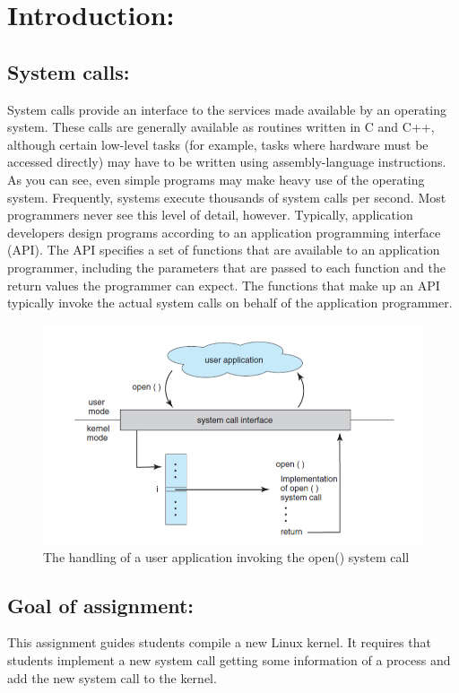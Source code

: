 \documentclass[a4paper]{article}
\begin{document}

\newpage
\tableofcontents
\newpage
\section{Introduction:}
\subsection{System calls:} 
System calls provide an interface to the services made available by an operating system. These calls are generally available as routines written in C and C++, although certain low-level tasks (for example, tasks where hardware must be accessed directly) may have to be written using assembly-language instructions.\\
As you can see, even simple programs may make heavy use of the operating system. Frequently, systems execute thousands of system calls per second. Most programmers never see this level of detail, however. Typically, application developers design programs according to an application programming interface (API). The API specifies a set of functions that are available to an application programmer, including the parameters that are passed to each function and the return values the programmer can expect. The functions that make up an API typically invoke the actual system calls on behalf of the application programmer.
\begin{figure}[h!]
\begin{center}
\includegraphics[width=14cm]{Intro.png}
\caption{The handling of a user application invoking the open() system call}
\end{center}
\end{figure}
\subsection{Goal of assignment:}
This assignment guides students compile a new Linux kernel. It requires that students implement a new system call getting some information of a process and add the new system call to the kernel.
\newpage
\end{document}
